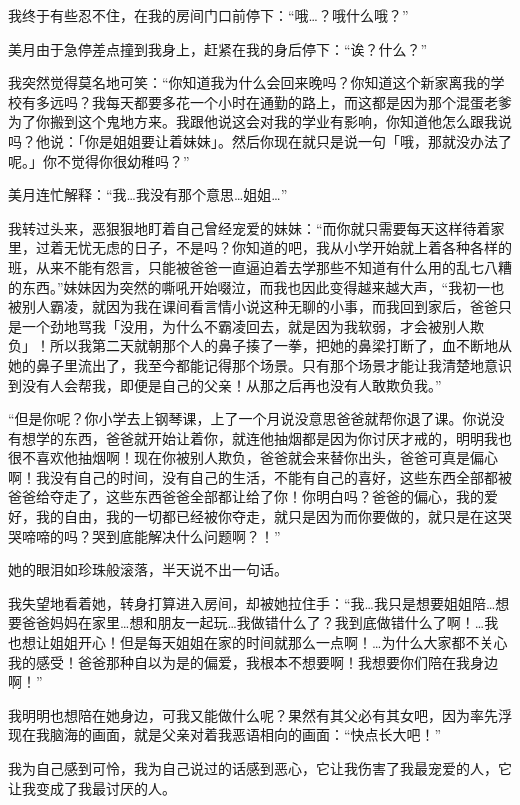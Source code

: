 我终于有些忍不住，在我的房间门口前停下：“哦…？哦什么哦？”

美月由于急停差点撞到我身上，赶紧在我的身后停下：“诶？什么？”

我突然觉得莫名地可笑：“你知道我为什么会回来晚吗？你知道这个新家离我的学校有多远吗？我每天都要多花一个小时在通勤的路上，而这都是因为那个混蛋老爹为了你搬到这个鬼地方来。我跟他说这会对我的学业有影响，你知道他怎么跟我说吗？他说：「你是姐姐要让着妹妹」。然后你现在就只是说一句「哦，那就没办法了呢。」你不觉得你很幼稚吗？”

美月连忙解释：“我…我没有那个意思…姐姐…”

我转过头来，恶狠狠地盯着自己曾经宠爱的妹妹：“而你就只需要每天这样待着家里，过着无忧无虑的日子，不是吗？你知道的吧，我从小学开始就上着各种各样的班，从来不能有怨言，只能被爸爸一直逼迫着去学那些不知道有什么用的乱七八糟的东西。”妹妹因为突然的嘶吼开始啜泣，而我也因此变得越来越大声，“我初一也被别人霸凌，就因为我在课间看言情小说这种无聊的小事，而我回到家后，爸爸只是一个劲地骂我「没用，为什么不霸凌回去，就是因为我软弱，才会被别人欺负」！所以我第二天就朝那个人的鼻子揍了一拳，把她的鼻梁打断了，血不断地从她的鼻子里流出了，我至今都能记得那个场景。只有那个场景才能让我清楚地意识到没有人会帮我，即便是自己的父亲！从那之后再也没有人敢欺负我。”

“但是你呢？你小学去上钢琴课，上了一个月说没意思爸爸就帮你退了课。你说没有想学的东西，爸爸就开始让着你，就连他抽烟都是因为你讨厌才戒的，明明我也很不喜欢他抽烟啊！现在你被别人欺负，爸爸就会来替你出头，爸爸可真是偏心啊！我没有自己的时间，没有自己的生活，不能有自己的喜好，这些东西全部都被爸爸给夺走了，这些东西爸爸全部都让给了你！你明白吗？爸爸的偏心，我的爱好，我的自由，我的一切都已经被你夺走，就只是因为而你要做的，就只是在这哭哭啼啼的吗？哭到底能解决什么问题啊？！”

她的眼泪如珍珠般滚落，半天说不出一句话。

我失望地看着她，转身打算进入房间，却被她拉住手：“我…我只是想要姐姐陪…想要爸爸妈妈在家里…想和朋友一起玩…我做错什么了？我到底做错什么了啊！…我也想让姐姐开心！但是每天姐姐在家的时间就那么一点啊！…为什么大家都不关心我的感受！爸爸那种自以为是的偏爱，我根本不想要啊！我想要你们陪在我身边啊！”

我明明也想陪在她身边，可我又能做什么呢？果然有其父必有其女吧，因为率先浮现在我脑海的画面，就是父亲对着我恶语相向的画面：“快点长大吧！”

我为自己感到可怜，我为自己说过的话感到恶心，它让我伤害了我最宠爱的人，它让我变成了我最讨厌的人。


